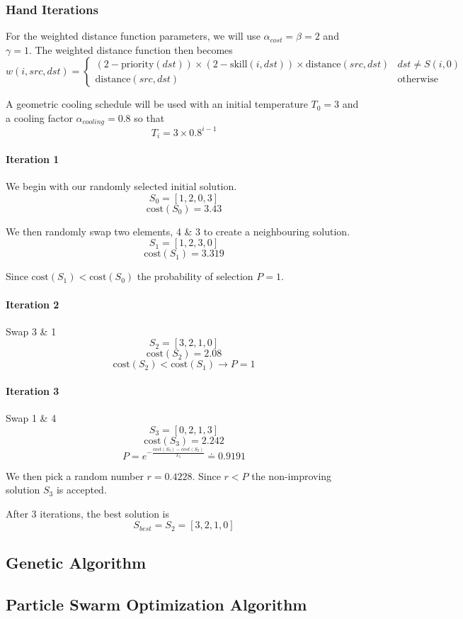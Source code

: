 \documentclass[a4paper]{article}
\newcommand{\subsubsubsection}[1]{\paragraph{#1} \mbox{}}
\begin{document}
\subsubsection{Hand Iterations}

For the weighted distance function parameters, we will use $\alpha_{cost} = \beta = 2$ and $\gamma = 1$. The weighted distance function then becomes 
$$
w(i, \mathit{src}, \mathit{dst}) = \begin{cases}
(2 - \text{priority}(\mathit{dst})) \times (2 - \text{skill}(i, \mathit{dst})) \times \text{distance}(\mathit{src}, \mathit{dst}) & \mathit{dst} \ne S(i,0) \\
\text{distance}(\mathit{src}, \mathit{dst}) & \text{otherwise}
\end{cases}
$$

A geometric cooling schedule will be used with an initial temperature $T_{0} = 3$ and a cooling factor $\alpha_{cooling} = 0.8$ so that
$$T_{i} = 3 \times 0.8^{i-1}$$

\subsubsubsection{Iteration 1}

We begin with our randomly selected initial solution.
$$S_0 = [ 1, 2, 0, 3 ]$$
$$\text{cost}(S_0) = 3.43$$

We then randomly swap two elements, 4 \& 3 to create a neighbouring solution.
$$S_1 = [ 1, 2, 3, 0 ]$$
$$\text{cost}(S_1) = 3.319$$

Since $\text{cost}(S_1) < \text{cost}(S_0)$ the probability of selection $P = 1$.

\subsubsubsection{Iteration 2}

Swap 3 \& 1
$$S_2 = [ 3, 2, 1, 0 ]$$
$$\text{cost}(S_2) = 2.08$$
$$\text{cost}(S_2) < \text{cost}(S_1) \rightarrow P = 1$$

\subsubsubsection{Iteration 3}

Swap 1 \& 4
$$S_3 = [ 0, 2, 1, 3 ]$$
$$\text{cost}(S_3) = 2.242$$
$$P = e^{-\frac{cost(S_3) - cost(S_2)}{T_3}} \doteq 0.9191$$

We then pick a random number $r = 0.4228$. Since $r < P$ the non-improving solution $S_3$ is accepted.

After 3 iterations, the best solution is
$$S_{best} = S_2 = [ 3, 2, 1, 0 ]$$

\subsection{Genetic Algorithm} %

\subsection{Particle Swarm Optimization Algorithm} %
\end{document}
